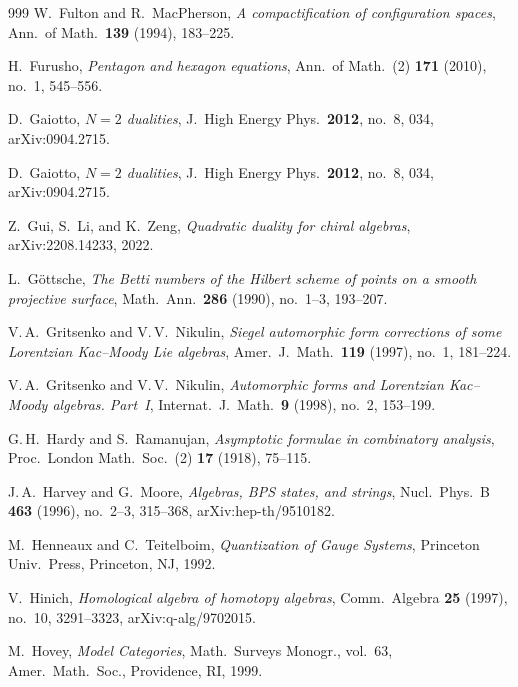 \documentclass[11pt]{memoir}
\begin{document}
\begin{thebibliography}{999}
W.~Fulton and R.~MacPherson, \emph{A compactification of configuration spaces}, Ann.\ of Math.\ \textbf{139} (1994), 183--225.

H.~Furusho, \emph{Pentagon and hexagon equations}, Ann.\ of Math.\ (2) \textbf{171} (2010), no.~1, 545--556.

D.~Gaiotto, \emph{$N=2$ dualities}, J.\ High Energy Phys.\ \textbf{2012}, no.~8, 034, arXiv:0904.2715.

D.~Gaiotto, \emph{$N=2$ dualities}, J.\ High Energy Phys.\ \textbf{2012}, no.~8, 034, arXiv:0904.2715.

Z.~Gui, S.~Li, and K.~Zeng, \emph{Quadratic duality for chiral algebras}, arXiv:2208.14233, 2022.

L.~G\"ottsche, \emph{The Betti numbers of the Hilbert scheme of points on a smooth projective surface}, Math.\ Ann.\ \textbf{286} (1990), no.~1--3, 193--207.

V.\,A.~Gritsenko and V.\,V.~Nikulin, \emph{Siegel automorphic form corrections of some Lorentzian Kac--Moody Lie algebras}, Amer.\ J.\ Math.\ \textbf{119} (1997), no.~1, 181--224.

V.\,A.~Gritsenko and V.\,V.~Nikulin, \emph{Automorphic forms and Lorentzian Kac--Moody algebras. Part~I}, Internat.\ J.\ Math.\ \textbf{9} (1998), no.~2, 153--199.

G.\,H.~Hardy and S.~Ramanujan, \emph{Asymptotic formulae in combinatory analysis}, Proc.\ London Math.\ Soc.\ (2) \textbf{17} (1918), 75--115.

J.\,A.~Harvey and G.~Moore, \emph{Algebras, BPS states, and strings}, Nucl.\ Phys.\ B \textbf{463} (1996), no.~2--3, 315--368, arXiv:hep-th/9510182.

M.~Henneaux and C.~Teitelboim, \emph{Quantization of Gauge Systems}, Princeton Univ.\ Press, Princeton, NJ, 1992.

V.~Hinich, \emph{Homological algebra of homotopy algebras}, Comm.\ Algebra \textbf{25} (1997), no.~10, 3291--3323, arXiv:q-alg/9702015.

M.~Hovey, \emph{Model Categories}, Math.\ Surveys Monogr., vol.~63, Amer.\ Math.\ Soc., Providence, RI, 1999.


\end{thebibliography}
\end{document}

